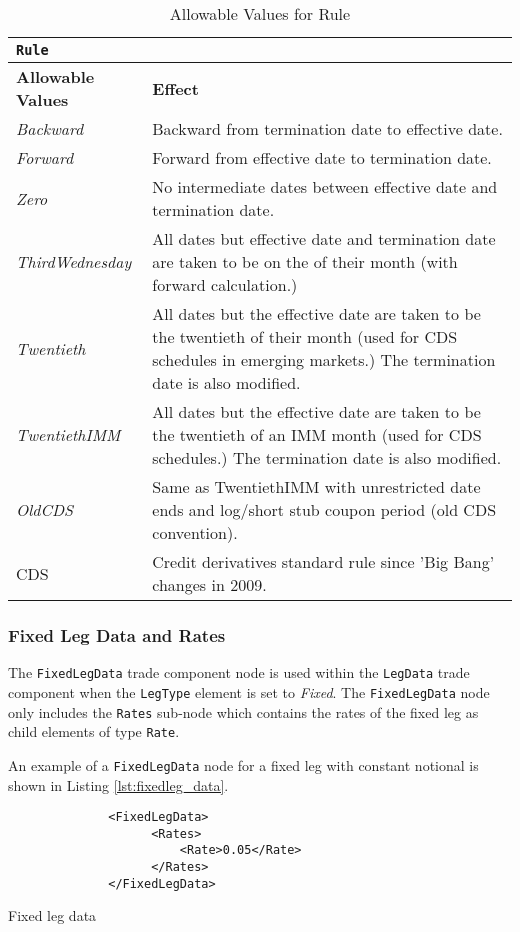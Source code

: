\begin{table}[H]
\centering
\begin{tabular}{|l|p{6cm}|}
\hline
\multicolumn{2}{|l|}{\lstinline!Rule!}                    \\ \hline
\textbf{Allowable Values}                   & \textbf{Effect}                       \\ \hline
\emph{Backward}   &   Backward from termination date to effective date.   \\ \hline
\emph{Forward}   &   Forward from effective date to termination date.  \\ \hline
\emph{Zero}   &   No intermediate dates between effective date and termination date.  \\ \hline
\emph{ThirdWednesday}   &   All dates but effective date and termination date are taken to be on the  of their month (with forward calculation.) \\ \hline
\emph{Twentieth}   &   All dates but the effective date are taken to be the twentieth of their month (used for CDS schedules in emerging markets.)  The termination date is also modified. \\ \hline
\emph{TwentiethIMM}   &   All dates but the effective date are  taken to be the twentieth of an IMM month (used for CDS schedules.)  The termination date is also modified. \\ \hline
\emph{OldCDS}   &   Same as TwentiethIMM with unrestricted date ends and log/short stub coupon period (old CDS convention).\\ \hline
CDS   &   Credit derivatives standard rule since 'Big Bang' changes in 2009.\\ \hline
\end{tabular}
  \caption{Allowable Values for Rule}
  \label{tab:rule}
\end{table}

\subsubsection{Fixed Leg Data and Rates}
\label{ss:fixedleg_data}

The \lstinline!FixedLegData! trade component node is used within the \lstinline!LegData! trade component when the \lstinline!LegType! element is set to \emph{Fixed}. The \lstinline!FixedLegData! node only includes the \lstinline!Rates! sub-node which contains the rates of the fixed leg as child elements of type \lstinline!Rate!.

An example of a \lstinline!FixedLegData! node for a fixed leg with constant notional is shown in Listing \ref{lst:fixedleg_data}.
\begin{listing}[H]
\begin{verbatim}
              <FixedLegData>
                    <Rates>
                        <Rate>0.05</Rate>
                    </Rates>
              </FixedLegData>
\end{verbatim}
\caption{Fixed leg data}
\label{lst:fixedleg_data}
\end{listing}

